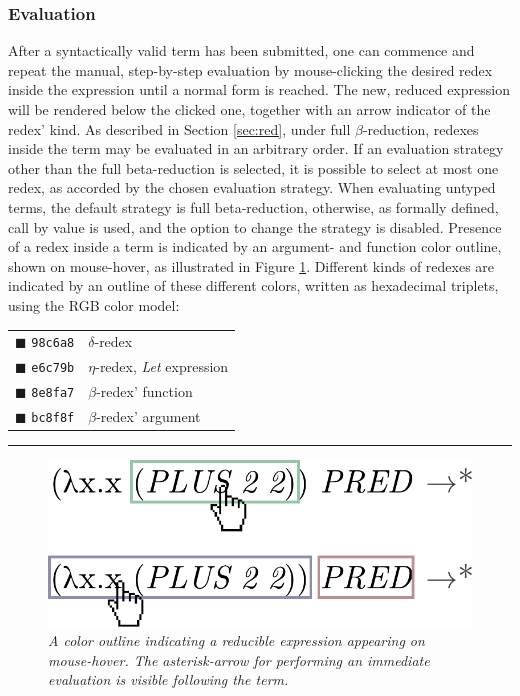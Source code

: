 \documentclass[table, a4paper, 10pt]{article}
\begin{document}
\subsubsection{Evaluation}\label{sec:eval}
After a syntactically valid term has been submitted, one can commence and repeat
the manual, step-by-step evaluation by
mouse-clicking the desired redex inside the expression until a normal form is reached.
The new, reduced expression will be rendered below the clicked one, together
with an arrow indicator of the redex' kind.
As described in Section \ref{sec:red},
under full $\beta$-reduction,
redexes inside the term may be evaluated in an arbitrary order.
If an evaluation strategy other than the full beta-reduction is selected, 
it is possible to select at most one redex, as accorded by the chosen evaluation strategy.
When evaluating untyped terms, the default strategy is full beta-reduction,
otherwise, as formally defined, call by value is used, and the option to change the 
strategy is disabled.
Presence of a redex inside a term is
indicated by an argument- and function color outline, shown on mouse-hover, as illustrated
in Figure \ref{redexfig}. Different kinds of redexes are indicated by an outline of these different colors,
written as hexadecimal triplets, using the RGB color model:
\begin{center}
\begin{tabular}{ll}
	{\color{delta}$\blacksquare$} \texttt{98c6a8}   &$\delta$-redex\\
	{\color{letexpr}$\blacksquare$} \texttt{e6c79b} &$\eta$-redex, \textit{Let} expression\\
	{\color{betaFunc}$\blacksquare$} \texttt{8e8fa7}&$\beta$-redex' function\\
	{\color{betaArg}$\blacksquare$} \texttt{bc8f8f} &$\beta$-redex' argument
\end{tabular}

\vspace{0.3cm}
\rule{7cm}{0.02cm}

\begin{figure}[H]\centering
\includegraphics[scale=0.5]{redexes.pdf}
\caption{\textit{A color outline indicating a reducible expression appearing on mouse-hover. The asterisk-arrow
for performing an immediate evaluation is visible following the term.}}\label{redexfig}
\end{figure}
\end{center}
\end{document}

